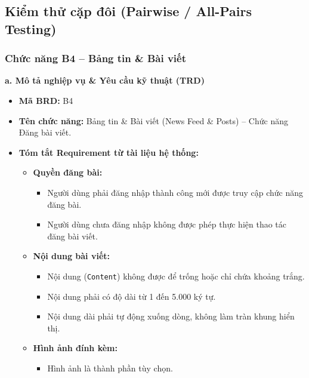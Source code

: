 \documentclass[11pt,a4paper]{article}
\begin{document}
\subsection{Kiểm thử cặp đôi (Pairwise / All-Pairs Testing)}

\subsubsection{Chức năng B4 -- Bảng tin \& Bài viết}

\noindent\textbf{a. Mô tả nghiệp vụ \& Yêu cầu kỹ thuật (TRD)}
\begin{itemize}[leftmargin=1.2cm, noitemsep]
    \item[\textbf{--}] \textbf{Mã BRD:} B4
    \item[\textbf{--}] \textbf{Tên chức năng:} Bảng tin \& Bài viết (News Feed \& Posts) -- Chức năng Đăng bài viết.
    \item[\textbf{--}] \textbf{Tóm tắt Requirement từ tài liệu hệ thống:}
    \begin{itemize}[leftmargin=0.8cm, label=$\ast$, noitemsep]
        \item \textbf{Quyền đăng bài:}
        \begin{itemize}[leftmargin=0.6cm, label=$\circ$, noitemsep]
            \item Người dùng phải đăng nhập thành công mới được truy cập chức năng đăng bài.
            \item Người dùng chưa đăng nhập không được phép thực hiện thao tác đăng bài viết.
        \end{itemize}
        \item \textbf{Nội dung bài viết:}
        \begin{itemize}[leftmargin=0.6cm, label=$\circ$, noitemsep]
            \item Nội dung (\texttt{Content}) không được để trống hoặc chỉ chứa khoảng trắng.
            \item Nội dung phải có độ dài từ 1 đến 5.000 ký tự.
            \item Nội dung dài phải tự động xuống dòng, không làm tràn khung hiển thị.
        \end{itemize}
        \item \textbf{Hình ảnh đính kèm:}
        \begin{itemize}[leftmargin=0.6cm, label=$\circ$, noitemsep]
            \item Hình ảnh là thành phần tùy chọn.

\end{itemize}
\end{itemize}
\end{itemize}
\end{document}

